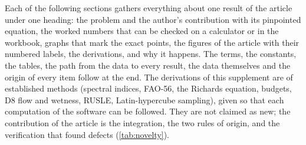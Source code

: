 Each of the following sections gathers everything about one result of the article under one heading: the problem and the author's contribution with its pinpointed equation, the worked numbers that can be checked on a calculator or in the workbook, graphs that mark the exact points, the figures of the article with their numbered labels, the derivations, and why it happens. The terms, the constants, the tables, the path from the data to every result, the data themselves and the origin of every item follow at the end. The derivations of this supplement are of established methods (spectral indices, FAO-56, the Richards equation, budgets, D8 flow and wetness, RUSLE, Latin-hypercube sampling), given so that each computation of the software can be followed. They are not claimed as new; the contribution of the article is the integration, the two rules of origin, and the verification that found defects (\cref{tab:novelty}).
